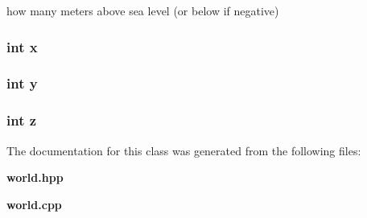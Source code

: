 how many meters above sea level (or below if negative) 

\subsubsection{\setlength{\rightskip}{0pt plus 5cm}int {\bf x}}\label{classHeightFlag_o0}


\subsubsection{\setlength{\rightskip}{0pt plus 5cm}int {\bf y}}\label{classHeightFlag_o1}


\subsubsection{\setlength{\rightskip}{0pt plus 5cm}int {\bf z}}\label{classHeightFlag_o2}




The documentation for this class was generated from the following files:\begin{CompactItemize}
\item 
{\bf world.hpp}\item 
{\bf world.cpp}\end{CompactItemize}

